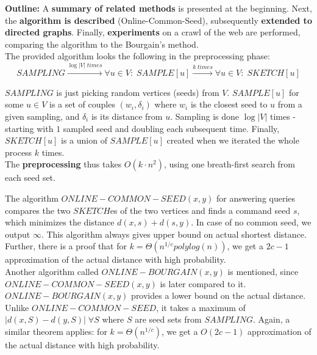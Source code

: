 \documentclass[a4paper]{article}
\newcommand{\textbff}[1]{{\large \textbf{#1}}}
\begin{document}
        \textbff{Outline:} A \textbf{summary of related methods} is presented at the beginning. Next, the \textbf{algorithm is described} (Online-Common-Seed), subsequently \textbf{extended to directed graphs}. Finally, \textbf{experiments} on a crawl of the web are performed, comparing the algorithm to the Bourgain's method. \\

        The provided algorithm looks the following in the preprocessing phase: \\

        \begin{equation*}
            SAMPLING \xrightarrow{\log |V| \; times} \forall u \in V: \; SAMPLE[u] \xrightarrow{k \; times} \forall u \in V: \; SKETCH[u]
        \end{equation*}
        \hspace*{\fill}

        {\boldmath$SAMPLING$} is just picking random vertices (seeds) from $V$. {\boldmath$SAMPLE[u]$} for some $u \in V$ is a set of couples $(w_i, \delta_i)$ where $w_i$ is the closest seed to $u$ from a given sampling, and $\delta_i$ is its distance from $u$. Sampling is done $\log |V|$ times - starting with $1$ sampled seed and doubling each subsequent time. Finally, {\boldmath$SKETCH[u]$} is a union of $SAMPLE[u]$ created when we iterated the whole process $k$ times. \\

        The \textbf{preprocessing }thus takes $O(k \cdot n^2)$, using one breath-first search from each seed set.

        The algorithm {\boldmath$ONLINE-COMMON-SEED(x, y)$} for answering queries compares the two $SKETCH$es of the two vertices and finds a command seed $s$, which minimizes the distance $d(x, s) + d(s, y)$. In case of no common seed, we output $\infty$. This algorithm always gives upper bound on actual shortest distance. \\

        Further, there is a proof that for $k=\Theta (n^{1/c}polylog(n))$, we get a $2c - 1$ approximation of the actual distance with high probability. \\

        Another algorithm called {\boldmath$ONLINE-BOURGAIN(x, y)$} is mentioned, since {\boldmath$ONLINE-COMMON-SEED(x, y)$} is later compared to it. {\boldmath$ONLINE-BOURGAIN(x, y)$} provides a lower bound on the actual distance. Unlike $ONLINE-COMMON-SEED$, it takes a maximum of $|d(x, S) - d(y, S)| \; \forall S$ where $S$ are seed sets from $SAMPLING$. Again, a similar theorem applies: for $k=\Theta (n^{1/c})$, we get a $O(2c - 1)$ approximation of the actual distance with high probability. \\
\end{document}
